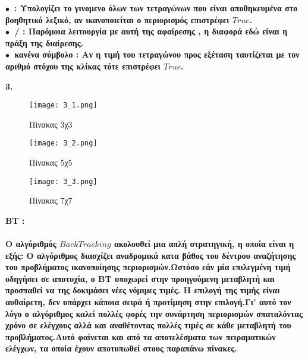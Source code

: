 \documentclass[10pt]{article}
\begin{document}
$\bullet \ $ \bf * \normalfont:  Υπολογίζει το γινομενο όλων των τετραγώνων που είναι αποθηκευμένα στο βοηθητικό λεξικό, αν ικανοποιείται ο περιορισμός επιστρέφει $True$. \\

$\bullet \ $ \bf / \normalfont:  Παρόμοια λειτουργία με αυτή της αφαίρεσης , η διαφορά εδώ είναι η πράξη της διαίρεσης. \\

$\bullet \ $ \bf κανένα σύμβολο \normalfont:  Αν η τιμή του τετραγώνου προς εξέταση ταυτίζεται με τον αριθμό στόχου της κλίκας τότε επιστρέφει $True$.


\vspace{5mm}

\bf 3. \normalfont \\

\begin{figure}[H]
    \texttt{[image: 3\_1.png]}\\
    \caption{Πίνακας 3χ3}
\end{figure} 
\begin{figure}[H]
    \texttt{[image: 3\_2.png]}\\
    \caption{Πίνακας 5χ5}
\end{figure} 
\begin{figure}[H]
    \texttt{[image: 3\_3.png]}\\
    \caption{Πίνακας 7χ7}
\end{figure} 
\bf ΒΤ \normalfont:
\\ \\ Ο αλγόριθμός $BackTracking$ ακολουθεί μια απλή στρατηγική, η οποία είναι η εξής: Ο αλγόριθμος διασχίζει αναδρομικά κατα βάθος του δέντρου αναζήτησης του προβλήματος ικανοποίησης περιορισμών.Ωστόσο εάν μία επιλεγμένη τιμή οδηγήσει σε αποτυχία, ο ΒΤ υποχωρεί στην προηγούμενη μεταβλητή και προσπαθεί να της δοκιμάσει νέες νόμιμες τιμές. Η επιλογή της τιμής είναι αυθαίρετη, δεν υπάρχει κάποια σειρά ή προτίμηση στην επιλογή.Γι’ αυτό τον λόγο ο αλγόριθμος καλεί πολλές φορές την συνάρτηση περιορισμών σπαταλόντας χρόνο σε ελέγχους αλλά και αναθέτοντας πολλές τιμές σε κάθε μεταβλητή του προβλήματος.Αυτό φαίνεται και από τα αποτελέσματα των πειραματικών ελέγχων, τα οποία έχουν αποτυπωθεί στους παραπάνω πίνακες. \\ \\
\end{document}
